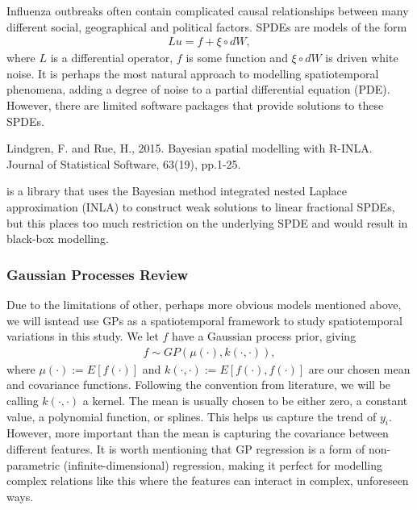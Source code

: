 \documentclass[letterpaper,10pt,english]{sphinxmanual}
\begin{document}
Influenza outbreaks often contain complicated causal relationships between many different social, geographical and political factors. SPDEs are models of the form
\begin{equation*}
\begin{split}Lu = f + \xi\circ dW,\end{split}
\end{equation*}
where \(L\) is a differential operator, \(f\) is some function and \(\xi\circ dW\)
is driven white noise. It is perhaps the most natural approach to modelling spatiotemporal phenomena, adding a degree of noise to a partial differential equation (PDE). However, there are limited software packages that provide
solutions to these SPDEs.  %
\begin{footnote}[8]\sphinxAtStartFootnote
Lindgren, F. and Rue, H., 2015. Bayesian spatial modelling with R-INLA. Journal of Statistical Software, 63(19), pp.1-25.
%
\end{footnote} is a library that uses the Bayesian
method integrated nested Laplace approximation (INLA) to construct weak
solutions to linear fractional SPDEs, but this places too much
restriction on the underlying SPDE and would result in black-box
modelling.


\subsubsection{Gaussian Processes Review}
\label{\detokenize{models/when:gaussian-processes-review}}
Due to the limitations of other, perhaps more obvious models mentioned above,  we will isntead use GPs as a spatiotemporal framework to
study spatiotemporal variations in this study. We let \(f\) have a Gaussian process prior, giving
\begin{equation*}
\begin{split}f\sim GP(\mu(\cdot), k(\cdot,\cdot)),\end{split}
\end{equation*}
where \(\mu(\cdot):= E[f(\cdot)]\) and \(k(\cdot,\cdot):= E[f(\cdot), f(\cdot)]\) are
our chosen mean and covariance functions.
Following the convention from literature, we will be calling \(k(\cdot,\cdot)\) a kernel. The mean is usually chosen to be either zero,
a constant value, a polynomial function, or splines. This helps us capture the trend of \(y_i\). However, more important than the mean is capturing the covariance between different features. It is
worth mentioning that GP regression is a form of non-parametric (infinite-dimensional) regression, making it perfect for modelling complex relations like this where the features can interact in complex, unforeseen ways.
\end{document}
